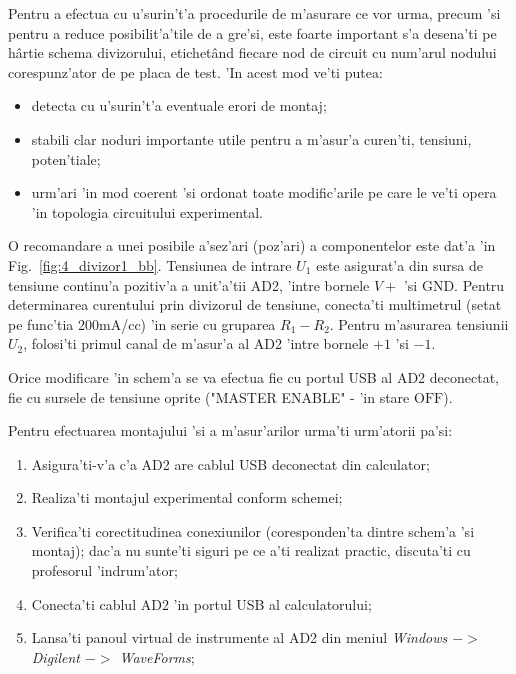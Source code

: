 \begin{exercise}  \label{Q5}
Pentru a efectua cu u'surin't'a procedurile de m'asurare ce vor urma, precum 'si pentru a reduce posibilit'a'tile de a gre'si, este foarte important s'a desena'ti pe h\^artie schema divizorului, etichet\^and fiecare nod de circuit cu num'arul nodului corespunz'ator de pe placa de test. 'In acest mod ve'ti putea:
\begin{itemize}
\item detecta cu u'surin't'a eventuale erori de montaj;
\item stabili clar noduri importante utile pentru a m'asur'a curen'ti, tensiuni, poten'tiale;
\item urm'ari 'in mod coerent 'si ordonat toate modific'arile pe care le ve'ti opera 'in topologia circuitului experimental.  
\end{itemize}
%
O recomandare a unei posibile a'sez'ari (poz'ari) a componentelor este dat'a 'in Fig.~\ref{fig:4_divizor1_bb}. Tensiunea de intrare $U_1$ este asigurat'a din sursa de tensiune continu'a pozitiv'a a unit'a'tii AD2, 'intre bornele $V+$ 'si $\mathrm{GND}$. Pentru determinarea curentului prin divizorul de tensiune, conecta'ti multimetrul (setat pe func'tia 200mA/cc) 'in serie cu gruparea $R_1 - R_2$. Pentru m'asurarea tensiunii $U_2$, folosi'ti primul canal de m'asur'a al AD2 'intre bornele $+1$ 'si $-1$.
\begin{retine}
	{\color{blue}
Orice modificare 'in schem'a se va efectua fie cu portul USB al AD2 deconectat, fie cu sursele de tensiune oprite 
("MASTER ENABLE" - 'in stare $\mathrm{OFF}$).
}
\end{retine}
Pentru efectuarea montajului 'si a m'asur'arilor urma'ti urm'atorii pa'si:
\begin{enumerate}
\item Asigura'ti-v'a c'a AD2 are cablul USB deconectat din calculator;
\item Realiza'ti montajul experimental conform schemei;  
\item Verifica'ti corectitudinea conexiunilor (coresponden'ta dintre schem'a 'si montaj); dac'a nu sunte'ti siguri pe ce a'ti realizat practic, discuta'ti cu profesorul 'indrum'ator;
\item Conecta'ti cablul AD2 'in portul USB al calculatorului;
\item Lansa'ti panoul virtual de instrumente al AD2 din meniul \textit{Windows $->$ Digilent $->$ WaveForms};

\end{enumerate}
\end{exercise}
